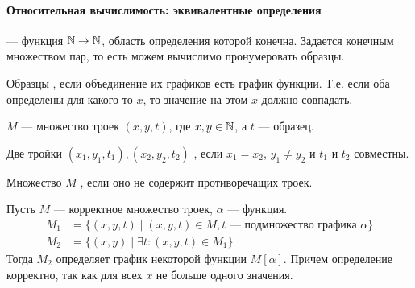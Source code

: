 \paragraph{Относительная вычислимость: эквивалентные определения}
\begin{defn}[Образец]
	 --- функция $ \mathbb{N} \to \mathbb{N}$, область определения которой конечна. Задается конечным множеством пар, то есть  можем вычислимо пронумеровать образцы.
	
	\noindent
	Образцы , если объединение их графиков есть график функции. Т.е. если оба определены для какого-то $ x$, то значение на этом $ x$ должно совпадать.
\end{defn}
\begin{defn}[]
	$ M$ --- множество троек $ (x, y, t)$, где  $ x, y \in \mathbb{N}$, а $ t$ --- образец.

	\noindent
	Две тройки $ (x_1, y_1, t_1), (x_2, y_2, t_2)$ , если $  x_1= x_2$, $  y_1 \ne  y_2$ и $  t_1$ и $  t_2$ совместны.

	\noindent
	Множество $ M$ , если оно не содержит противоречащих троек.
\end{defn}
\begin{defn}
    Пусть  $  M$ --- корректное множество троек, $ \alpha $ --- функция.
	\[
	\begin{aligned}
		M_1& = \{(x, y, t) \mid (x, y, t) \in M, t \text{ --- подмножество графика } \alpha \} \\
		M_2&= \{(x, y) \mid \exists t\colon (x, y, t) \in M_1\}
	\end{aligned}
	\]
	Тогда $  M_2$ определяет график некоторой функции $ M[ \alpha ]$. Причем определение корректно, так как для всех $ x$ не больше одного значения.
\end{defn}

